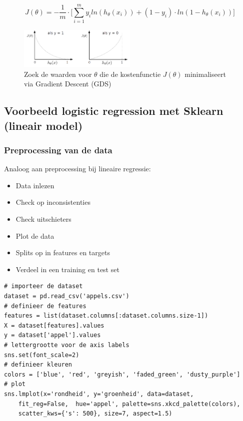 \documentclass{article}
\begin{document}
\begin{equation}
J(\theta) = -\frac{1}{m} \cdot \Bigg[ \sum_{i=1}^m y_i ln(h_{\theta}(x_i)) + (1 - y_i) \cdot ln(1 - h_{\theta}(x_i)) \Bigg]
\end{equation}

\begin{figure}[H]
    \centering
    \includegraphics[width=0.5\textwidth]{logistic-kostenfunctie.png}
    \caption{Zoek de waarden voor $\theta$ die de kostenfunctie $J(\theta)$ minimaliseert via Gradient Descent (GDS)}
\end{figure}

\subsection{Voorbeeld logistic regression met Sklearn (lineair model)}

\subsubsection{Preprocessing van de data}

Analoog aan preprocessing bij lineaire regressie:

\begin{itemize}
    \item Data inlezen
    \item Check op inconsistenties
    \item Check uitschieters
    \item Plot de data
    \item Splits op in features en targets
    \item Verdeel in een training en test set
\end{itemize}

\begin{verbatim}
# importeer de dataset
dataset = pd.read_csv('appels.csv')
# definieer de features
features = list(dataset.columns[:dataset.columns.size-1])
X = dataset[features].values
y = dataset['appel'].values
# lettergrootte voor de axis labels
sns.set(font_scale=2) 
# definieer kleuren
colors = ['blue', 'red', 'greyish', 'faded_green', 'dusty_purple']
# plot
sns.lmplot(x='rondheid', y='groenheid', data=dataset, 
    fit_reg=False,  hue='appel', palette=sns.xkcd_palette(colors), 
    scatter_kws={'s': 500}, size=7, aspect=1.5)
\end{verbatim}
\end{document}
